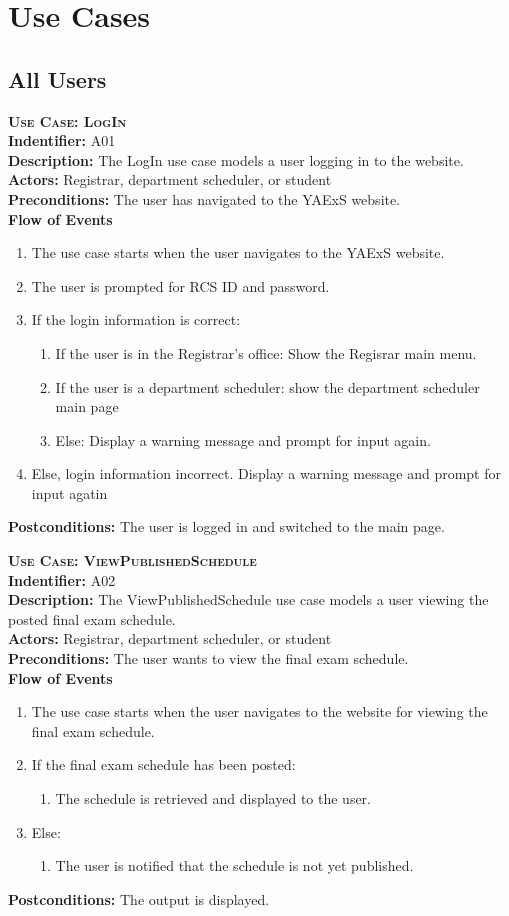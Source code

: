 \documentclass[11pt]{article}
\newcounter{id}
\newenvironment{usecase}{%
	\def\title##1{ {\large \bfseries  \scshape {Use Case:} ##1} \\ }
 	\def\id##1{{\bf Indentifier:} ##1\\}
	\def\des##1{ {\bf Description:} ##1\\}
	\def\actors##1{ {\bf Actors:} ##1\\}
    	\def\pre##1{ {\bf Preconditions:} ##1 \\} %
    	\def\flow##1{ {\bf Flow of Events} ##1}%
    	\newenvironment{ucenum}{%
        	\begin{enumerate}[nolistsep]\small}%
        	{\end{enumerate}}
	\def\post##1{ {\bf Postconditions:} ##1 \\}
}{\vspace{.05in}}
\begin{document}
\section{Use Cases} %

\subsection{All Users}
\begin{usecase}
  \title{LogIn}
  \id{A01}
  \des{The LogIn use case models a user logging in to the website.}
  \actors{Registrar, department scheduler, or student}
  \pre{The user has navigated to the YAExS website.}
  \flow{}
  \begin{ucenum}
  \item The use case starts when the user navigates to the YAExS website.
  \item The user is prompted for RCS ID and password.
  \item If the login information is correct:
    \begin{ucenum}
    \item If the user is in the Registrar's office: Show the Regisrar main menu.
    \item If the user is a department scheduler: show the department scheduler main page
    \item Else: Display a warning message and prompt for input again.
    \end{ucenum}
  \item Else, login information incorrect. Display a warning message and prompt for input agatin
  \end{ucenum}
  \post{The user is logged in and switched to the main page.}
\end{usecase}

\begin{usecase}
  \title{ViewPublishedSchedule}
  \id{A02}
  \des{The ViewPublishedSchedule use case models a user viewing the posted final exam schedule.}
  \actors{Registrar, department scheduler, or student}
  \pre{The user wants to view the final exam schedule.}
  \flow{}
  \begin{ucenum}
  \item The use case starts when the user navigates to the website for viewing the final exam schedule.
  \item If the final exam schedule has been posted:
    \begin{ucenum} \item The schedule is retrieved and displayed to the user. \end{ucenum}
  \item Else:
    \begin{ucenum} \item The user is notified that the schedule is not yet published. \end{ucenum}
  \end{ucenum}
  \post{The output is displayed.}
\end{usecase}
\end{document}
